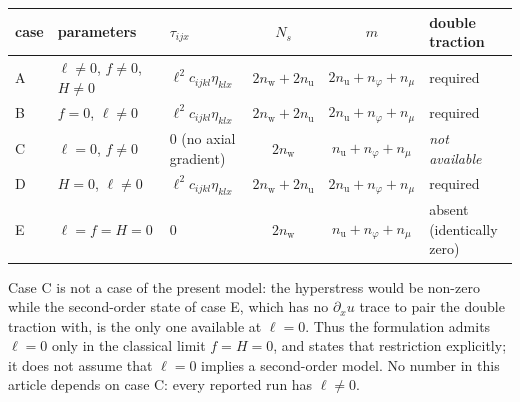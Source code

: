 \begin{center}
\renewcommand{\arraystretch}{1.15}\scriptsize\setlength{\tabcolsep}{3pt}
\begin{tabular}{@{}lllccl@{}}
\toprule
case & parameters & $\tau_{ijx}$ & $N_s$ & $m$ & double traction \\
\midrule
A & $\ell\neq0$, $f\neq0$, $H\neq0$ & $\ell^{2}c_{ijkl}\eta_{klx}$ & $2n_{\mathrm w}+2n_{\mathrm u}$ & $2n_{\mathrm u}+n_\varphi+n_\mu$ & required \\
B & $f=0$, $\ell\neq0$ & $\ell^{2}c_{ijkl}\eta_{klx}$ & $2n_{\mathrm w}+2n_{\mathrm u}$ & $2n_{\mathrm u}+n_\varphi+n_\mu$ & required \\
C & $\ell=0$, $f\neq0$ & $0$ (no axial gradient) & $2n_{\mathrm w}$ & $n_{\mathrm u}+n_\varphi+n_\mu$ & \emph{not available} \\
D & $H=0$, $\ell\neq0$ & $\ell^{2}c_{ijkl}\eta_{klx}$ & $2n_{\mathrm w}+2n_{\mathrm u}$ & $2n_{\mathrm u}+n_\varphi+n_\mu$ & required \\
E & $\ell=f=H=0$ & $0$ & $2n_{\mathrm w}$ & $n_{\mathrm u}+n_\varphi+n_\mu$ & absent (identically zero) \\
\bottomrule
\end{tabular}
\end{center}

\noindent Case C is not a case of the present model: the hyperstress would be non-zero while the
second-order state of case E, which has no $\partial_x u$ trace to pair the
double traction with, is the only one available at $\ell=0$.  Thus the formulation admits $\ell=0$ only in the classical limit $f=H=0$, and states that restriction explicitly; it does not assume that $\ell=0$ implies a second-order model.  No
number in this article depends on case C: every reported run has $\ell\neq0$.

